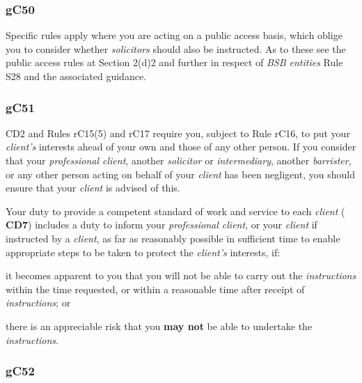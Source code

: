 \subsubsection{\color{darkgrey}gC50}

Specific rules apply where you are acting on a public access basis,
which oblige you to consider whether \emph{solicitors} should also be
instructed. As to these see the public access rules at Section 2(d)2 and
further in respect of \emph{BSB entities} Rule S28 and the associated
guidance.

\subsubsection{\color{darkgrey}gC51}

CD2 and Rules rC15(5) and rC17 require you, subject to Rule rC16, to put
your \emph{client's} interests ahead of your own and those of any other
person. If you consider that your \emph{professional client}, another
\emph{solicitor} or \emph{intermediary}, another \emph{barrister}, or
any other person acting on behalf of your \emph{client} has been
negligent, you should ensure that your \emph{client} is advised of this.




Your duty to provide a competent standard of work and service to each
\emph{client} ( \textbf{\textcolor{mygold}{CD7}}) includes a duty to inform your \emph{professional
client}, or your \emph{client} if instructed by a \emph{client}, as far
as reasonably possible in sufficient time to enable appropriate steps to
be taken to protect the \emph{client's} interests, if:
\begin{numlist}\item it becomes apparent to you that you will not be able to carry out the
\emph{instructions} within the time requested, or within a reasonable
time after receipt of \emph{instructions}; or
\item there is an appreciable risk that you \textcolor{myred}{\textbf{may not}} be able to undertake
the \emph{instructions}.
\end{numlist}


\subsubsection{\color{darkgrey}gC52}

